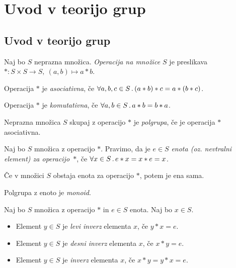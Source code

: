 \section{Uvod v teorijo grup}
\subsection{Uvod v teorijo grup}
\begin{definicija}
    Naj bo $S$ neprazna množica. \emph{Operacija na množice $S$} je preslikava $*: S \times S \to S, \ (a,b) \mapsto a * b$.

    Operacija $*$ je \emph{asociativna}, če $\forall a, b, c \in S \,.\, (a*b)*c = a*(b*c)$.

    Operacija $*$ je \emph{komutativna}, če $\forall a, b \in S \,.\, a* b = b* a$.
\end{definicija}

\begin{definicija}
    Neprazna množica $S$ skupaj z operacijo $*$ je \emph{polgrupa}, če je operacija $*$ asociativna.
\end{definicija}

\begin{definicija}
    Naj bo $S$ množica z operacijo $*$. Pravimo, da je $e \in S$ \emph{enota (oz. nevtralni element) za operacijo~$*$}, če $\forall x \in S \,.\, e * x = x * e = x$.
\end{definicija}

\begin{trditev}
    Če v množici $S$ obstaja enota za operacijo $*$, potem je ena sama.
\end{trditev}

\begin{definicija}
    Polgrupa z enoto je \emph{monoid}.
\end{definicija}

\begin{definicija}
    Naj bo $S$ množica z operacijo $*$ in $e \in S$ enota. Naj bo $x \in S$.
    \begin{itemize}
        \item Element $y \in S$ je \emph{levi inverz} elementa $x$, če $y * x = e$.
        \item Element $y \in S$ je \emph{desni inverz} elementa $x$, če $x * y = e$.
        \item Element $y \in S$ je \emph{inverz} elementa $x$, če $x *y = y* x = e$.
    \end{itemize}
\end{definicija}

